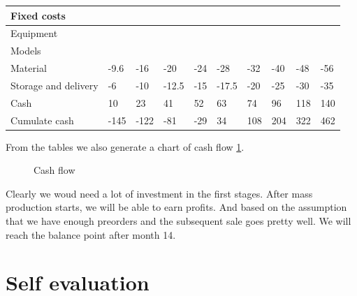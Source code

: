 \documentclass[12pt,twoside]{article}
\begin{document}
\begin{table}[]
\begin{tabular}{|l|l|l|l|l|l|l|l|l|l|}
    Fixed costs                  &      &      &       &       &       &       &       &       &       \\ \hline
    Equipment                    &      &      &       &       &       &       &       &       &       \\ \hline
    Models                       &      &      &       &       &       &       &       &       &       \\ \hline
    Material                     & -9.6 & -16  & -20   & -24   & -28   & -32   & -40   & -48   & -56   \\ \hline
    Storage and delivery         & -6   & -10  & -12.5 & -15   & -17.5 & -20   & -25   & -30   & -35   \\ \hline
    Cash                         & 10   & 23   & 41    & 52    & 63    & 74    & 96    & 118   & 140   \\ \hline
    Cumulate cash                & -145 & -122 & -81   & -29   & 34    & 108   & 204   & 322   & 462    \\  \hline
    \end{tabular}
    \label{chart:Financial detail 2}
\end{table}

From the tables we also generate a chart of cash flow \ref{fig:Cash flow}.

\begin{figure}[!htb]
    \centering
    \caption{Cash flow}
    \label{fig:Cash flow}
\end{figure}
Clearly we woud need a lot of investment in the first stages. After mass production starts, we will be able to earn profits. And based on the assumption that we have
enough preorders and the subsequent sale goes pretty well. We will reach the balance point after month 14.

\section{Self evaluation}
\end{document}
